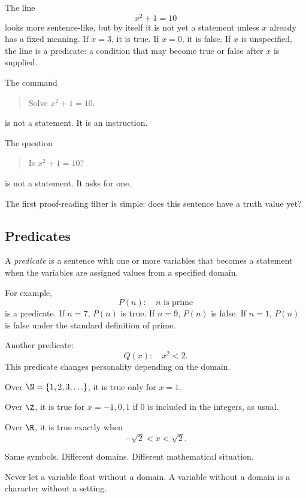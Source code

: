The line
\[
x^2+1=10
\]
looks more sentence-like, but by itself it is not yet a statement unless $x$ already has a fixed meaning. If $x=3$, it is true. If $x=0$, it is false. If $x$ is unspecified, the line is a predicate: a condition that may become true or false after $x$ is supplied.

The command

\begin{quote}
Solve $x^2+1=10$.
\end{quote}

is not a statement. It is an instruction.

The question

\begin{quote}
Is $x^2+1=10$?
\end{quote}

is not a statement. It asks for one.

\begin{focusbox}
The first proof-reading filter is simple: does this sentence have a truth value yet?
\end{focusbox}

\subsection{Predicates}

\begin{formalbox}
A \emph{predicate} is a sentence with one or more variables that becomes a statement when the variables are assigned values from a specified domain.
\end{formalbox}

For example,
\[
P(n):\quad n\text{ is prime}
\]
is a predicate. If $n=7$, $P(n)$ is true. If $n=9$, $P(n)$ is false. If $n=1$, $P(n)$ is false under the standard definition of prime.

Another predicate:
\[
Q(x):\quad x^2<2.
\]
This predicate changes personality depending on the domain.

Over $\N=\{1,2,3,\ldots\}$, it is true only for $x=1$.

Over $\Z$, it is true for $x=-1,0,1$ if $0$ is included in the integers, as usual.

Over $\R$, it is true exactly when
\[
-\sqrt2<x<\sqrt2.
\]

Same symbols. Different domains. Different mathematical situation.

\begin{trapbox}
Never let a variable float without a domain. A variable without a domain is a character without a setting.
\end{trapbox}

